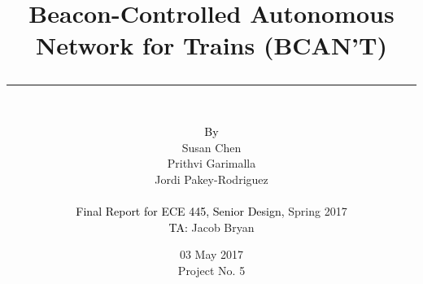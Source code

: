 \documentclass[openbib,letterpaper,10pt]{article}
\author{\vspace{0.5in}\\
	\textcolor{black}{By}\\
	#1
	\vspace{0.8in}\\
	\textcolor{black}{Final Report for ECE 445, Senior Design,} #2\\
	\textcolor{black}{TA:} #3
	\vspace{0.3in}}
\newcommand{\thetitle}[1]{\title{\begin{Huge}{\bf #1}\end{Huge} \color{subtitlecolor}\rule[25pt]{\textwidth}{1pt}}}
\newcommand{\theauthor}[3]{
	\author{\vspace{0.5in}\\
	\textcolor{black}{By}\\
	#1
	\vspace{0.8in}\\
	\textcolor{black}{Final Report for ECE 445, Senior Design,} #2\\
	\textcolor{black}{TA:} #3
	\vspace{0.3in}}
}
\begin{document}
\pagestyle{empty}
\doublespacing

\thetitle{Beacon-Controlled Autonomous Network for Trains (BCAN'T)}

\theauthor{
	Susan Chen\\
	Prithvi Garimalla\\
	Jordi Pakey-Rodriguez
}
{ %
	Spring 2017
}
{ %
	Jacob Bryan
}

\date{
03 May 2017\\
Project No. 5
\clearpage
}
\end{document}
